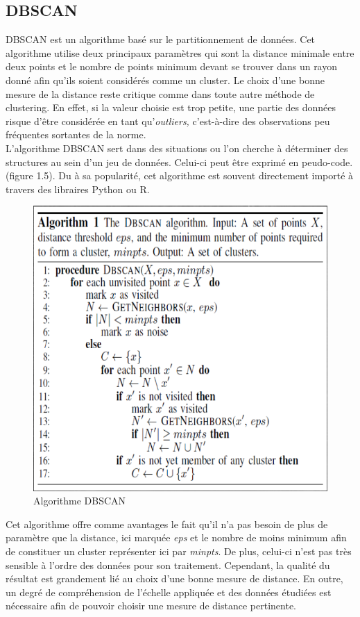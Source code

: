 \documentclass[memoire.tex]{subfiles}
\begin{document}
\newpage
\subsection{DBSCAN}
DBSCAN est un algorithme basé sur le partitionnement de données. Cet algorithme utilise deux principaux paramètres qui sont la distance minimale entre deux points et le nombre de points minimum devant se trouver dans un rayon donné afin qu'ils soient considérés comme un cluster\cite{ref12}. Le choix d'une bonne mesure de la distance reste critique comme dans toute autre méthode de clustering. En effet, si la valeur choisie est trop petite, une partie des données risque d'être considérée en tant qu'\textit {outliers,} c'est-à-dire des observations peu fréquentes sortantes de la norme.\\
L'algorithme DBSCAN sert dans des situations ou l'on cherche à déterminer des structures au sein d'un jeu de données. Celui-ci peut être exprimé en peudo-code.(figure 1.5). Du à sa popularité, cet algorithme est souvent directement importé à travers des libraires Python ou R.
	\begin{figure}[h!]
		\centerline{\includegraphics[scale=0.8]{img/dbscan.png}}
		\caption{Algorithme DBSCAN}
	\end{figure}
Cet algorithme offre comme avantages le fait qu'il n'a pas besoin de plus de paramètre que la distance, ici marquée \textit{eps} et le nombre de moins minimum afin de constituer un cluster représenter ici par \textit{minpts}. De plus, celui-ci n'est pas très sensible à l'ordre des données pour son traitement. Cependant, la qualité du résultat est grandement lié au choix d'une bonne mesure de distance. En outre, un degré de compréhension de l'échelle appliquée et des données étudiées est nécessaire afin de pouvoir choisir une mesure de distance pertinente.\\
\end{document}
